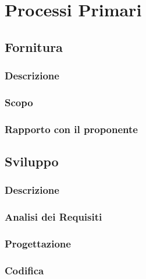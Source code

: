 \section{Processi Primari}


    \subsection{Fornitura}
        \subsubsection{Descrizione}
        
        \subsubsection{Scopo}
        
        \subsubsection{Rapporto con il proponente}
        
        
    \subsection{Sviluppo}
        \subsubsection{Descrizione}
        \subsubsection{Analisi dei Requisiti}
        \subsubsection{Progettazione}
        \subsubsection{Codifica}
